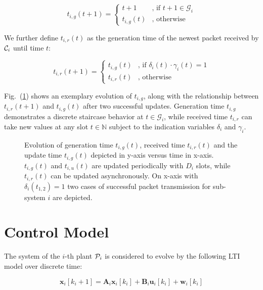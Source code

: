\begin{equation}
  t_{i,g}(t+1) =
  \begin{cases}
  t+1 & \text{, if } t+1 \in \mathcal{G}_i \\
  t_{i,g}(t) & \text{, otherwise}	
  \end{cases}
\end{equation}

We further define $t_{i,r}(t)$ as the generation time of the newest packet
received by $\mathcal{C}_i$ until time $t$:

\begin{equation}
  t_{i, r}(t+1) =
  \begin{cases}
  t_{i, g}(t) & \text{, if } \delta_i(t) \cdot \gamma_i(t) = 1 \\
  t_{i, r}(t) & \text{, otherwise}	
  \end{cases}
\end{equation}

Fig.~(\ref{fig:ageplot}) shows an exemplary evolution of $t_{i,g}$, along with
the relationship between ${t_{i,r}(t+1)}$ and $t_{i,g}(t)$ after two successful
updates. Generation time $t_{i,g}$ demonstrates a discrete staircase behavior at
$t \in \mathcal{G}_i$, while received time $t_{i,r}$ can take new values at any
slot $t \in \mathbb{N}$ subject to the indication variables $\delta_i$ and
$\gamma_i$.

\begin{figure}[htb]
  \centering
  \resizebox*{.6\columnwidth}{!}{} 
  \caption[Example evolution of generation time $t_{i,g}$, received time
  $t_{i,r}$ and update time $t_{i,g}$]{Evolution of generation time
  $t_{i,g}(t)$, received time $t_{i,r}(t)$ and the update time $t_{i,g}(t)$
  depicted in y-axis versus time in x-axis. $t_{i,g}(t)$ and $t_{i,u}(t)$ are
  updated periodically with $D_i$ slots, while $t_{i,r}(t)$ can be updated
  asynchronously. On x-axis with $\delta_i(t_{1,2})=1$ two cases of successful
  packet transmission for sub-system $i$ are depicted.}
  \label{fig:ageplot}
\end{figure}  

\section{Control Model}

The system of the $i$-th plant $\mathcal{P}_i$ is considered to evolve by the following
LTI model over discrete time:

\begin{equation}
  \label{eq:discretemodel}
  \boldsymbol{x}_i[k_i+1] = \boldsymbol{A}_i \boldsymbol{x}_i[k_i] + \boldsymbol{B}_i \boldsymbol{u}_i[k_i] + \boldsymbol{w}_i[k_i]
\end{equation}

